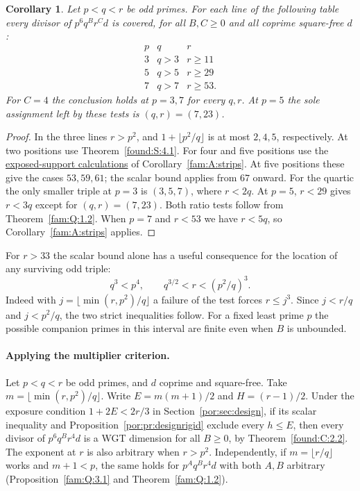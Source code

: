 \documentclass[11pt,a4paper]{article}
\numberwithin{equation}{section}
\newtheorem{corollary}[theorem]{Corollary}
\theoremstyle{remark}
\begin{document}
\begin{corollary}\label{found:C:2.3}\label{found:C:key:cor:concrete}
Let $p<q<r$ be odd primes. For each line of the following table
every divisor of $p^6 q^B r^C d$ is covered, for all $B,C\ge0$
and all coprime square-free $d$:
\[
\begin{array}{c|c|c}
p& q &r\\\hline
3&q>3&r\ge11\\
5&q>5&r\ge29\\
7&q>7&r\ge53 .
\end{array}
\]
For $C=4$ the conclusion holds at $p=3,7$ for every $q,r$.
At $p=5$ the sole assignment left by these tests is $(q,r)=(7,23)$.
\end{corollary}
\begin{proof}
In the three lines $r>p^2$, and $1+\lfloor p^2/q\rfloor$ is at
most $2,4,5$, respectively. At two positions use Theorem~\ref{found:S:4.1}.
For four and five positions use the \href{https://github.com/sebastienpalcoux/WGT-fusion-categories/blob/f7f9f9a02f3116e61eb9dca4eebfed77001494e8/code/exposed_support.py}{exposed-support calculations} of Corollary~\ref{fam:A:strips}. At five positions these give the cases $53,59,61$; the scalar bound applies from $67$ onward.
For the quartic the only smaller triple at $p=3$ is $(3,5,7)$,
where $r<2q$. At $p=5$, $r<29$ gives $r<3q$ except for $(q,r)=(7,23)$.
Both ratio tests follow from Theorem~\ref{fam:Q:1.2}.
When $p=7$ and $r<53$ we have $r<5q$, so Corollary~\ref{fam:A:strips} applies.
\end{proof}

For $r>33$ the scalar bound alone has a useful consequence for the
location of any surviving odd triple:
\[
 q^3<p^4,\qquad q^{3/2}<r<(p^2/q)^3 .
\]
Indeed with $j=\lfloor\min(r,p^2)/q\rfloor$ a failure of the test
forces $r\le j^3$. Since $j<r/q$ and $j<p^2/q$, the two strict
inequalities follow. For a fixed least prime $p$ the possible
companion primes in this interval are finite even when $B$ is unbounded.

\paragraph{Applying the multiplier criterion.}

Let $p<q<r$ be odd primes, and $d$ coprime and square-free. Take $m=\lfloor\min(r,p^2)/q\rfloor$. Write $E=m(m+1)/2$ and $H=(r-1)/2$. Under the exposure condition $1+2E<2r/3$ in Section~\ref{por:sec:design}, if its scalar inequality and Proposition~\ref{por:pr:designrigid} exclude every $h\le E$, then every divisor of $p^6q^B r^4d$ is a WGT dimension for all $B\ge0$, by Theorem~\ref{found:C:2.2}. The exponent at $r$ is also arbitrary when $r>p^2$. Independently, if $m=\lfloor r/q\rfloor$ works and $m+1<p$, the same holds for $p^Aq^Br^4d$ with both $A,B$ arbitrary (Proposition~\ref{fam:Q:3.1} and Theorem~\ref{fam:Q:1.2}).
\end{document}
